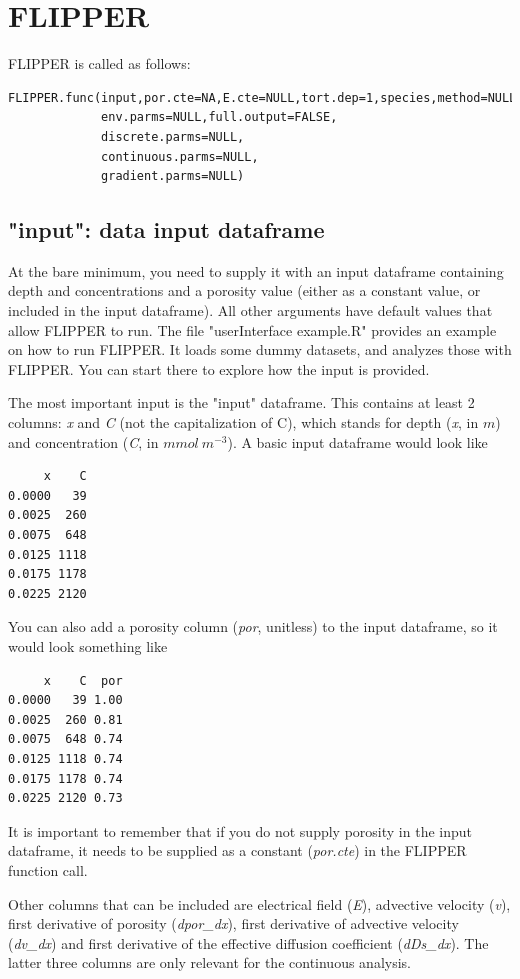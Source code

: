 \documentclass[10pt]{article}
\begin{document}
\section{FLIPPER}
\label{sect_functioning}
FLIPPER is called as follows:
\begin{verbatim}
FLIPPER.func(input,por.cte=NA,E.cte=NULL,tort.dep=1,species,method=NULL,
             env.parms=NULL,full.output=FALSE,
             discrete.parms=NULL,
             continuous.parms=NULL,
             gradient.parms=NULL)
\end{verbatim}

\subsection{"input": data input dataframe}
At the bare minimum, you need to supply it with an input dataframe containing depth and concentrations and a porosity value (either as a constant value, or included in the input dataframe). All other arguments have default values that allow FLIPPER to run. The file "userInterface example.R" provides an example on how to run FLIPPER. It loads some dummy datasets, and analyzes those with FLIPPER. You can start there to explore how the input is provided.

The most important input is the "input" dataframe. This contains at least 2 columns: \textit{x} and \textit{C} (not the capitalization of C), which stands for depth (\textit{x}, in $m$) and concentration (\textit{C}, in $mmol \: m^{-3}$). A basic input dataframe would look like
\begin{verbatim}
     x    C
0.0000   39
0.0025  260
0.0075  648
0.0125 1118
0.0175 1178
0.0225 2120
\end{verbatim}  



You can also add a porosity column (\textit{por}, unitless) to the input dataframe, so it would look something like
\begin{verbatim}
     x    C  por
0.0000   39 1.00
0.0025  260 0.81
0.0075  648 0.74
0.0125 1118 0.74
0.0175 1178 0.74
0.0225 2120 0.73
\end{verbatim}
It is important to remember that if you do not supply porosity in the input dataframe, it needs to be supplied as a constant (\textit{por.cte}) in the FLIPPER function call. 

Other columns that can be included are electrical field (\textit{E}), advective velocity (\textit{v}), first derivative of porosity (\textit{dpor\_dx}), first derivative of advective velocity (\textit{dv\_dx}) and first derivative of the effective diffusion coefficient (\textit{dDs\_dx}). The latter three columns are only relevant for the continuous analysis.
\end{document}
